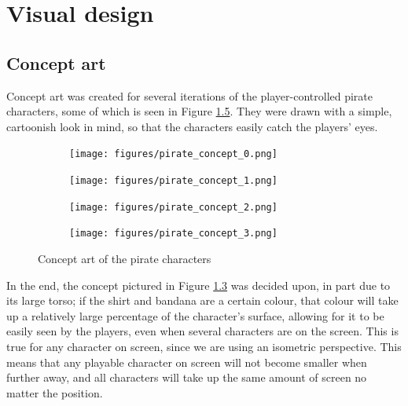 \chapter{Visual design}\label{ch:visualDesign}
\section{Concept art}
Concept art was created for several iterations of the player-controlled pirate characters, some of which is seen in Figure \ref{fig:pirate_concepts}. They were drawn with a simple, cartoonish look in mind, so that the characters easily catch the players' eyes. 

\begin{figure}[h!]
    \centering
    \begin{subfigure}[b]{0.2\textwidth}
		\centering        
        \texttt{[image: figures/pirate\_concept\_0.png]}\caption{ \label{fig:pirate_concept_0}}
    \end{subfigure}
    \begin{subfigure}[b]{0.2\textwidth}
    	\centering
        \texttt{[image: figures/pirate\_concept\_1.png]}\caption{ \label{fig:pirate_concept_1}}
    \end{subfigure}
    \begin{subfigure}[b]{0.2\textwidth}
    	\centering
        \texttt{[image: figures/pirate\_concept\_2.png]}\caption{ \label{fig:pirate_concept_2}}
    \end{subfigure}
    \begin{subfigure}[b]{0.2\textwidth}
    	\centering
        \texttt{[image: figures/pirate\_concept\_3.png]}\caption{ \label{fig:pirate_concept_3}}
    \end{subfigure}
    \caption{Concept art of the pirate characters}\label{fig:pirate_concepts}
\end{figure}

In the end, the concept pictured in Figure \ref{fig:pirate_concept_2} was decided upon, in part due to its large torso; if the shirt and bandana are a certain colour, that colour will take up a relatively large percentage of the character's surface, allowing for it to be easily seen by the players, even when several characters are on the screen. This is true for any character on screen, since we are using an isometric perspective. This means that any playable character on screen will not become smaller when further away, and all characters will take up the same amount of screen no matter the position.


